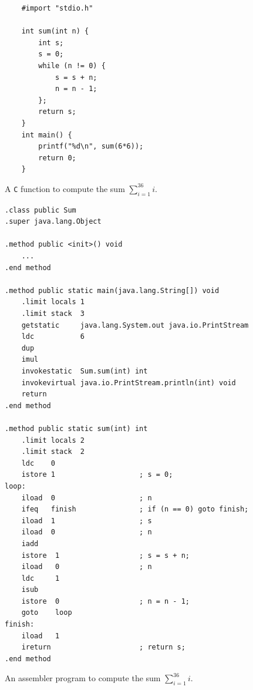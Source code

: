 \begin{figure}[!ht]
  \centering
  \begin{verbatim}
    #import "stdio.h"
    
    int sum(int n) {
        int s;
        s = 0;
        while (n != 0) {
            s = s + n;
            n = n - 1;    
        };
        return s;
    }
    int main() {
        printf("%d\n", sum(6*6));
        return 0;
    }
\end{verbatim}
\vspace*{-0.3cm}
\caption{A \texttt{C} function to compute the sum $\sum\limits_{i=1}^{36} i$.}
\label{fig:sum-assembler.c}
\end{figure}

\begin{figure}[!ht]
  \centering
\begin{verbatim}
.class public Sum
.super java.lang.Object

.method public <init>() void
    ...
.end method

.method public static main(java.lang.String[]) void
    .limit locals 1
    .limit stack  3
    getstatic     java.lang.System.out java.io.PrintStream
    ldc           6
    dup
    imul
    invokestatic  Sum.sum(int) int
    invokevirtual java.io.PrintStream.println(int) void
    return
.end method

.method public static sum(int) int
    .limit locals 2
    .limit stack  2
    ldc    0
    istore 1                    ; s = 0;
loop:
    iload  0                    ; n
    ifeq   finish               ; if (n == 0) goto finish;
    iload  1                    ; s
    iload  0                    ; n
    iadd
    istore  1                   ; s = s + n;
    iload   0                   ; n
    ldc     1
    isub
    istore  0                   ; n = n - 1;
    goto    loop
finish:
    iload   1
    ireturn                     ; return s;
.end method
\end{verbatim}
\vspace*{-0.3cm}
\caption{An assembler program to compute the sum $\sum\limits_{i=1}^{36} i$.}
\label{fig:Sum.jas}
\end{figure}

